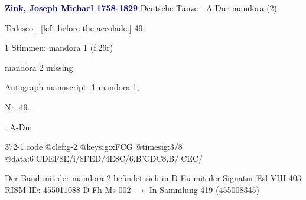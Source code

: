 \documentclass[twocolumn]{book}
\begin{document}
\newline \par \vspace{7pt} \textcolor{darkblue}{\textbf{Zink, Joseph Michael  1758-1829}}
\newline Deutsche Tänze - A-Dur
\newline mandora (2)
\newline \begin{itshape}[f.26r, at left:] Tedesco | [left before the accolade:] 49.\end{itshape} 
\newline \textcolor{darkblue}{}  1 Stimmen: mandora 1  (f.26r)
\newline \begin{small} mandora 2 missing\end{small} 
\newline Autograph manuscript
.1  mandora 1, \begin{itshape}Nr. 49.\end{itshape}, A-Dur  
\begin{filecontents*}{372-1.code}
@clef:g-2
@keysig:xFCG
@timesig:3/8
@data:{6'CDEF}8E/i/8FED/4E8C/{6,B'CDC}8,B/'CEC/
\end{filecontents*}
\newline
%
\newline Der Band mit der mandora 2 befindet sich in D Eu mit der Signatur Esl VIII 403
\newline RISM-ID: 455011088
\newline D-Fh  Ms 002
\newline $\rightarrow$ In Sammlung 419 (455008345)
      
\end{document}
